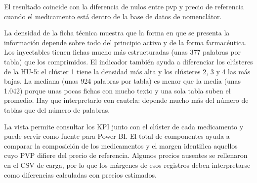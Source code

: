 \documentclass[11pt,a4paper]{article}
\begin{document}
El resultado coincide con la diferencia de nulos entre pvp y precio de referencia cuando el
medicamento está dentro de la base de datos de nomenclátor.

La densidad de la ficha técnica muestra que la forma en que se presenta la información
depende sobre todo del principio activo y de la forma farmacéutica. Los inyectables tienen
fichas mucho más estructuradas (unas 377 palabras por tabla) que los comprimidos. El
indicador también ayuda a diferenciar los clústeres de la HU-5: el clúster 1 tiene la densidad
más alta y los clústeres 2, 3 y 4 las más bajas. La mediana (unas 924 palabras por tabla) es
menor que la media (unas 1.042) porque unas pocas fichas con mucho texto y una sola tabla
suben el promedio. Hay que interpretarlo con cautela: depende mucho más del número de
tablas que del número de palabras.

La vista permite consultar los KPI junto con el clúster de cada medicamento y puede servir
como fuente para Power BI. El total de componentes ayuda a comparar la composición de los
medicamentos y el margen identifica aquellos cuyo PVP difiere del precio de referencia.
Algunos precios ausentes se rellenaron en el CSV de carga, por lo que los márgenes de esos
registros deben interpretarse como diferencias calculadas con precios estimados.
\end{document}
